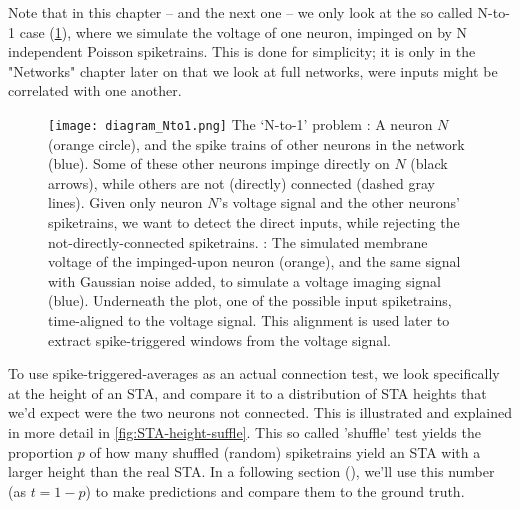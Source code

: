 Note that in this chapter -- and the next one -- we only look at the so called N-to-1 case (\cref{fig:diagram_Nto1}), where we simulate the voltage of one neuron, impinged on by N independent Poisson spiketrains. This is done for simplicity; it is only in the "Networks" chapter later on that we look at full networks, were inputs might be correlated with one another.

\begin{figure}
    \vspace*{2em}
    \hspace*{-1em}
    \texttt{[image: diagram\_Nto1.png]}
    \vspace*{-1.4em}
    \captionn
        {The `N-to-1' problem}
        {\Left: A neuron $N$ (orange circle), and the spike trains of other neurons in the network (blue). Some of these other neurons impinge directly on $N$ (black arrows), while others are not (directly) connected (dashed gray lines). Given only neuron $N$'s voltage signal and the other neurons' spiketrains, we want to detect the direct inputs, while rejecting the not-directly-connected spiketrains.\newline
        \Right: The simulated membrane voltage of the impinged-upon neuron (orange), and the same signal with Gaussian noise added, to simulate a voltage imaging signal (blue). Underneath the plot, one of the possible input spiketrains, time-aligned to the voltage signal.
        This alignment is used later to extract spike-triggered windows from the voltage signal.}
    \label{fig:diagram_Nto1}
\end{figure}

To use spike-triggered-averages as an actual connection test, we look specifically at the height of an STA, and compare it to a distribution of STA heights that we'd expect were the two neurons not connected. This is illustrated and explained in more detail in \cref{fig:STA-height-suffle}. This so called 'shuffle' test yields the proportion $p$ of how many shuffled (random) spiketrains yield an STA with a larger height than the real STA. In a following section (), we'll use this number (as $t = 1 - p$) to make predictions and compare them to the ground truth.

